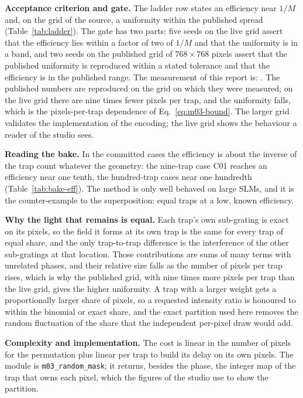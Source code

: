 \textbf{Acceptance criterion and gate.} The ladder row states an efficiency near $1/M$ and, on the grid of the source, a uniformity within the published spread (Table~\ref{tab:ladder}). The gate has two parts: five seeds on the live grid assert that the efficiency lies within a factor of two of $1/M$ and that the uniformity is in a band, and two seeds on the published grid of $768\times768$ pixels assert that the published uniformity is reproduced within a stated tolerance and that the efficiency is in the published range. The measurement of this report is: . The published numbers are reproduced on the grid on which they were measured; on the live grid there are nine times fewer pixels per trap, and the uniformity falls, which is the pixels-per-trap dependence of Eq.~\eqref{eq:m03-bound}. The larger grid validates the implementation of the encoding; the live grid shows the behaviour a reader of the studio sees.

\textbf{Reading the bake.} In the committed cases the efficiency is about the inverse of the trap count whatever the geometry: the nine-trap case C01 reaches an efficiency near one tenth, the hundred-trap cases near one hundredth (Table~\ref{tab:bake-eff}). The method is only well behaved on large SLMs, and it is the counter-example to the superposition: equal traps at a low, known efficiency.

\textbf{Why the light that remains is equal.} Each trap's own sub-grating is exact on its pixels, so the field it forms at its own trap is the same for every trap of equal share, and the only trap-to-trap difference is the interference of the other sub-gratings at that location. Those contributions are sums of many terms with unrelated phases, and their relative size falls as the number of pixels per trap rises, which is why the published grid, with nine times more pixels per trap than the live grid, gives the higher uniformity. A trap with a larger weight gets a proportionally larger share of pixels, so a requested intensity ratio is honoured to within the binomial or exact share, and the exact partition used here removes the random fluctuation of the share that the independent per-pixel draw would add.

\textbf{Complexity and implementation.} The cost is linear in the number of pixels for the permutation plus linear per trap to build its delay on its own pixels. The module is \texttt{m03\_random\_mask}; it returns, besides the phase, the integer map of the trap that owns each pixel, which the figures of the studio use to show the partition.

